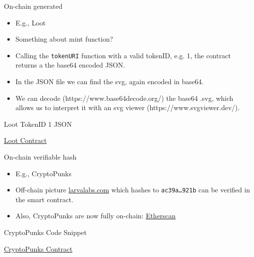 \documentclass[handout]{beamer}
\begin{document}
\begin{frame}{On-chain generated}
	\begin{itemize}
		\item E.g., Loot
		\item Something about mint function?
		\item Calling the \texttt{tokenURI} function with a valid tokenID, e.g. 1, the contract returns a the base64 encoded JSON.
		\item In the JSON file we can find the svg, again encoded in base64.
		\item We can decode (https://www.base64decode.org/) the base64 .svg, which allows us to interpret it with an svg viewer (https://www.svgviewer.dev/).
	\end{itemize}
\begin{samplecode}{Loot TokenID 1 JSON}
		
	\end{samplecode}
	\vspace{-0.5em}
	\begin{center}
		\link \href{}{Loot Contract}
	\end{center}
\end{frame}

\begin{frame}{On-chain verifiable hash}
	\begin{itemize}
		\item E.g., CryptoPunks
		\item Off-chain picture \link \href{https://www.larvalabs.com/public/images/cryptopunks/punks.png}{larvalabs.com} which hashes to \texttt{\scriptsize ac39a\dots 921b} can be verified in the smart contract.
		\item Also, CryptoPunks are now fully on-chain: \link \href{https://etherscan.io/address/0x16f5a35647d6f03d5d3da7b35409d65ba03af3b2}{Etherscan}  %
	\end{itemize}
	\begin{samplecode}{CryptoPunks Code Snippet}
		
	\end{samplecode}
\vspace{-1em}
\begin{center}
	\link \href{https://etherscan.io/address/0xb47e3cd837ddf8e4c57f05d70ab865de6e193bbb}{CryptoPunks Contract}
\end{center}
\end{frame}
\end{document}
